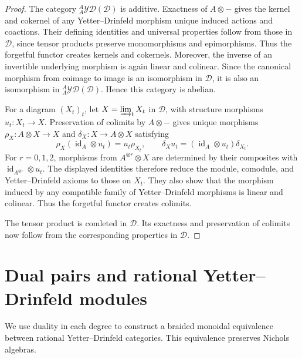 \documentclass[11pt, a4paper]{article}
\numberwithin{equation}{section}
\newcommand{\D}{\mathcal D}
\newcommand{\YD}{\mathcal{YD}}
\DeclareMathOperator{\id}{id}
\begin{document}
\begin{proof}

The category ${}_A^A\YD(\D)$ is additive.
Exactness of $A\otimes-$ gives the kernel and cokernel
of any Yetter--Drinfeld morphism unique induced actions
and coactions.
Their defining identities and universal properties follow
from those in $\D$, since tensor products preserve
monomorphisms and epimorphisms.
Thus the forgetful functor creates kernels and cokernels.
Moreover, the inverse of an invertible underlying morphism
is again linear and colinear.
Since the canonical morphism from coimage to image is
an isomorphism in $\D$, it is also an isomorphism in
${}_A^A\YD(\D)$.
Hence this category is abelian.

For a diagram $(X_t)_t$, let $X=\varinjlim_tX_t$ in $\D$,
with structure morphisms $u_t:X_t\to X$.
Preservation of colimits by $A\otimes-$ gives unique
morphisms $\rho_X:A\otimes X\to X$ and
$\delta_X:X\to A\otimes X$ satisfying
\[
 \rho_X(\id_A\otimes u_t)=u_t\rho_{X_t},
 \qquad
 \delta_Xu_t=(\id_A\otimes u_t)\delta_{X_t}.
\]
For $r=0,1,2$, morphisms from $A^{\otimes r}\otimes X$
are determined by their composites with
$\id_{A^{\otimes r}}\otimes u_t$.
The displayed identities therefore reduce the module,
comodule, and Yetter--Drinfeld axioms to those on $X_t$.
They also show that the morphism induced by any compatible
family of Yetter--Drinfeld morphisms is linear and colinear.
Thus the forgetful functor creates colimits.

The tensor product is comleted in $\D$.
Its exactness and preservation of colimits now follow
from the corresponding properties in $\D$.
\end{proof}


\section{ {Dual pairs} and rational Yetter--Drinfeld modules}\label{sec:duality}
We use duality in each degree to construct a braided monoidal
equivalence between rational Yetter--Drinfeld categories.
This equivalence preserves Nichols algebras.
\end{document}
